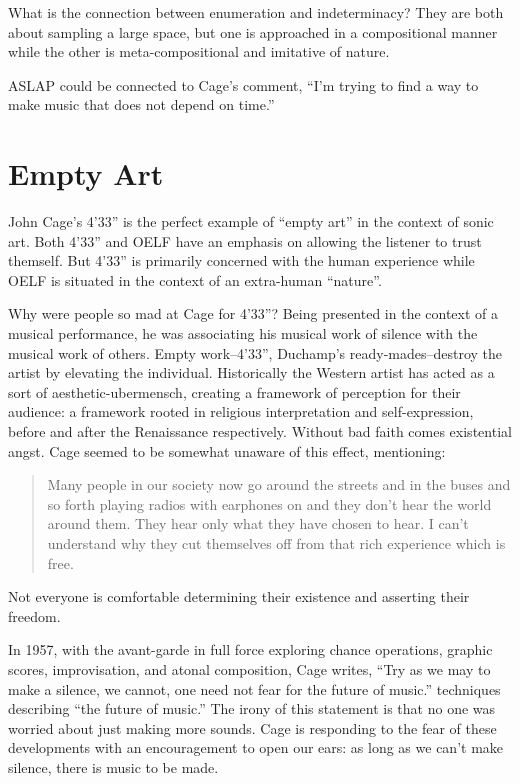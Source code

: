 \documentclass{thesis}
\begin{document}
	What is the connection between enumeration and indeterminacy? They are both about sampling a large space, but one is approached in a compositional manner while the other is meta-compositional and imitative of nature.
	
	ASLAP could be connected to Cage's comment, ``I'm trying to find a way to make music that does not depend on time.''
	
\section{Empty Art}

	\cite{larry_j_solomon_sounds_1998}
	John Cage's 4'33'' is the perfect example of ``empty art'' in the context of sonic art. Both 4'33'' and OELF have an emphasis on allowing the listener to trust themself. But 4'33'' is primarily concerned with the human experience while OELF is situated in the context of an extra-human ``nature''.
	
	Why were people so mad at Cage for 4'33''? Being presented in the context of a musical performance, he was associating his musical work of silence with the musical work of others. Empty work--4'33'', Duchamp's ready-mades--destroy the artist by elevating the individual. Historically the Western artist has acted as a sort of aesthetic-ubermensch, creating a framework of perception for their audience: a framework rooted in religious interpretation and self-expression, before and after the Renaissance respectively. Without bad faith comes existential angst. Cage seemed to be somewhat unaware of this effect, mentioning:
	
\begin{quote}
	Many people in our society now go around the streets and in the buses and so forth playing radios with earphones on and they don't hear the world around them. They hear only what they have chosen to hear. I can't understand why they cut themselves off from that rich experience which is free.
\end{quote}

	Not everyone is comfortable determining their existence and asserting their freedom.
	
	In 1957, with the avant-garde in full force exploring chance operations, graphic scores, improvisation, and atonal composition, Cage writes, ``Try as we may to make a silence, we cannot, one need not fear for the future of music.''  techniques describing ``the future of music.'' The irony of this statement is that no one was worried about just making more sounds. Cage is responding to the fear of these developments with an encouragement to open our ears: as long as we can't make silence, there is music to be made.
	
\end{document}
